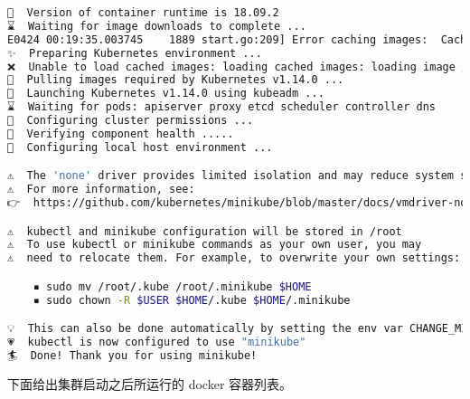 \begin{lstlisting}[language=bash]
🐳  Version of container runtime is 18.09.2
⌛  Waiting for image downloads to complete ...
E0424 00:19:35.003745    1889 start.go:209] Error caching images:  Caching images for kubeadm: caching images: caching image /root/.minikube/cache/images/gcr.io/k8s-minikube/storage-provisioner_v1.8.1: fetching remote image: Get https://gcr.io/v2/: dial tcp 74.125.204.82:443: i/o timeout
✨  Preparing Kubernetes environment ...
❌  Unable to load cached images: loading cached images: loading image /root/.minikube/cache/images/gcr.io/k8s-minikube/storage-provisioner_v1.8.1: stat /root/.minikube/cache/images/gcr.io/k8s-minikube/storage-provisioner_v1.8.1: no such file or directory
🚜  Pulling images required by Kubernetes v1.14.0 ...
🚀  Launching Kubernetes v1.14.0 using kubeadm ... 
⌛  Waiting for pods: apiserver proxy etcd scheduler controller dns
🔑  Configuring cluster permissions ...
🤔  Verifying component health .....
🤹  Configuring local host environment ...

⚠️  The 'none' driver provides limited isolation and may reduce system security and reliability.
⚠️  For more information, see:
👉  https://github.com/kubernetes/minikube/blob/master/docs/vmdriver-none.md

⚠️  kubectl and minikube configuration will be stored in /root
⚠️  To use kubectl or minikube commands as your own user, you may
⚠️  need to relocate them. For example, to overwrite your own settings:

    ▪ sudo mv /root/.kube /root/.minikube $HOME
    ▪ sudo chown -R $USER $HOME/.kube $HOME/.minikube

💡  This can also be done automatically by setting the env var CHANGE_MINIKUBE_NONE_USER=true
💗  kubectl is now configured to use "minikube"
🏄  Done! Thank you for using minikube!
\end{lstlisting}

下面给出集群启动之后所运行的 docker 容器列表。

